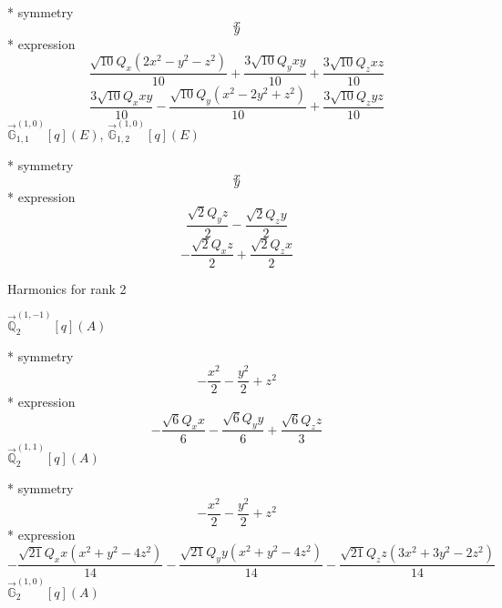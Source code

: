 \documentclass[fleqn,8pt]{jsarticle}
\begin{document}
\noindent\quad ** symmetry
\begin{dmath*}
x
\end{dmath*}
\begin{dmath*}
y
\end{dmath*}
\noindent\quad ** expression
\begin{dmath*}
\frac{\sqrt{10} Q_{x} \left(2 x^{2} - y^{2} - z^{2}\right)}{10} + \frac{3 \sqrt{10} Q_{y} x y}{10} + \frac{3 \sqrt{10} Q_{z} x z}{10}
\end{dmath*}
\begin{dmath*}
\frac{3 \sqrt{10} Q_{x} x y}{10} - \frac{\sqrt{10} Q_{y} \left(x^{2} - 2 y^{2} + z^{2}\right)}{10} + \frac{3 \sqrt{10} Q_{z} y z}{10}
\end{dmath*}
\noindent\quad $\vec{\mathbb{G}}_{1,1}^{(1,0)}[q](E)$, $\vec{\mathbb{G}}_{1,2}^{(1,0)}[q](E)$

\noindent\quad ** symmetry
\begin{dmath*}
x
\end{dmath*}
\begin{dmath*}
y
\end{dmath*}
\noindent\quad ** expression
\begin{dmath*}
\frac{\sqrt{2} Q_{y} z}{2} - \frac{\sqrt{2} Q_{z} y}{2}
\end{dmath*}
\begin{dmath*}
- \frac{\sqrt{2} Q_{x} z}{2} + \frac{\sqrt{2} Q_{z} x}{2}
\end{dmath*}

\noindent * Harmonics for rank 2

\noindent\quad $\vec{\mathbb{Q}}_{2}^{(1,-1)}[q](A)$

\noindent\quad ** symmetry
\begin{dmath*}
- \frac{x^{2}}{2} - \frac{y^{2}}{2} + z^{2}
\end{dmath*}
\noindent\quad ** expression
\begin{dmath*}
- \frac{\sqrt{6} Q_{x} x}{6} - \frac{\sqrt{6} Q_{y} y}{6} + \frac{\sqrt{6} Q_{z} z}{3}
\end{dmath*}
\noindent\quad $\vec{\mathbb{Q}}_{2}^{(1,1)}[q](A)$

\noindent\quad ** symmetry
\begin{dmath*}
- \frac{x^{2}}{2} - \frac{y^{2}}{2} + z^{2}
\end{dmath*}
\noindent\quad ** expression
\begin{dmath*}
- \frac{\sqrt{21} Q_{x} x \left(x^{2} + y^{2} - 4 z^{2}\right)}{14} - \frac{\sqrt{21} Q_{y} y \left(x^{2} + y^{2} - 4 z^{2}\right)}{14} - \frac{\sqrt{21} Q_{z} z \left(3 x^{2} + 3 y^{2} - 2 z^{2}\right)}{14}
\end{dmath*}
\noindent\quad $\vec{\mathbb{G}}_{2}^{(1,0)}[q](A)$
\end{document}
